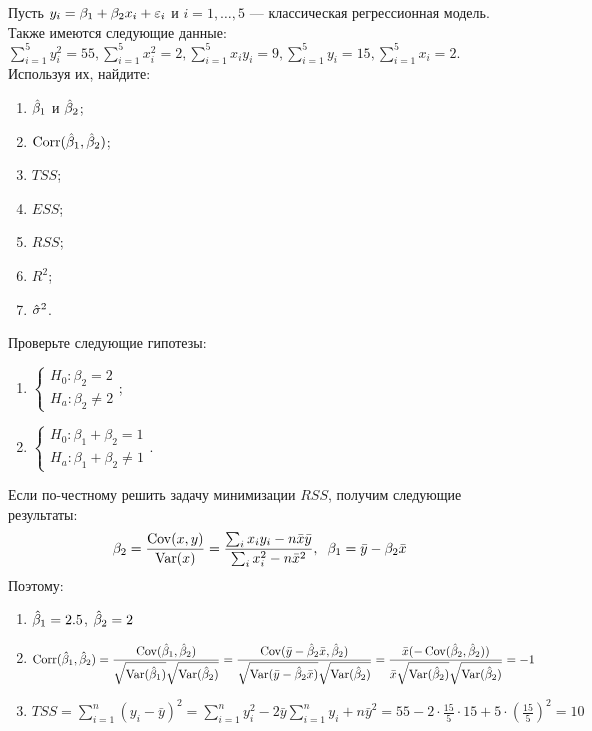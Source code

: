 \begin{problem}
Пусть $y_i = \beta_1 + \beta_2 x_i + \varepsilon_i$ и $i = 1, \dots, 5$ — классическая регрессионная модель. Также имеются следующие данные: $\sum_{i=1}^5 y_i^2 = 55, \sum_{i=1}^5 x_i^2 = 2, \sum_{i=1}^5 x_iy_i = 9, \sum_{i=1}^5 y_i = 15, \sum_{i=1}^5 x_i = 2.$ Используя их, найдите:

\begin{enumerate}
\item $\hat{\beta}_1$ и $\hat{\beta}_2$;
\item $\operatorname{Corr}(\hat{\beta}_1, \hat{\beta}_2)$;
\item $TSS$;
\item $ESS$;
\item $RSS$;
\item $R^2$;
\item $\hat{\sigma}^2$.
\end{enumerate}

Проверьте следующие гипотезы:
\begin{enumerate}
\item $\begin{cases}  H_0: \beta_2 = 2  \\ H_a: \beta_2 \not= 2 \end{cases}$;
\item $\begin{cases}  H_0: \beta_1 + \beta_2 = 1  \\ H_a: \beta_1 + \beta_2 \not= 1 \end{cases}$.
\end{enumerate}


\begin{sol}
Если по-честному решить задачу минимизации \(RSS\), получим следующие результаты:
\[
\beta_2 = \frac{\operatorname{Cov}(x, y)}{\operatorname{Var}(x)} = \frac{\sum_ix_iy_i - n\bar{x}\bar{y}}{\sum_ix_i^2 - n\bar{x}^2}, \hspace{2mm} \beta_1 = \bar{y} - \beta_2\bar{x}
\]
Поэтому:
\begin{enumerate}
\item $\hat{\beta}_1 = 2.5$, $\hat{\beta}_2  = 2$
\item  \[\operatorname{Corr}(\hat{\beta}_1, \hat{\beta}_2) = \frac{\operatorname{Cov}(\hat{\beta}_1, \hat{\beta}_2)}{\sqrt{\operatorname{Var}(\hat{\beta}_1)}\sqrt{\operatorname{Var}(\hat{\beta}_2)}} =  \frac{\operatorname{Cov}(\bar{y}-\hat{\beta}_2\bar{x}, \hat{\beta}_2)}{\sqrt{\operatorname{Var}(\bar{y}-\hat{\beta}_2\bar{x})} \sqrt{\operatorname{Var}(\hat{\beta}_2)}} = \frac{\bar{x}(- \operatorname{Cov}(\hat{\beta}_2,\hat{\beta}_2))}{\bar{x} \sqrt{\operatorname{Var}(\hat{\beta}_2)}\sqrt{\operatorname{Var}(\hat{\beta}_2)}} = -1\]

\item $TSS=\sum_{i=1}^n(y_i-\bar{y})^2 = \sum_{i=1}^ny_i^2 -2\bar{y}\sum_{i=1}^ny_i + n\bar{y}^2 = 55 - 2\cdot\frac{15}{5}\cdot15 + 5\cdot\left(\frac{15}{5}\right)^2=10$


\end{enumerate}
\end{sol}
\end{problem}
